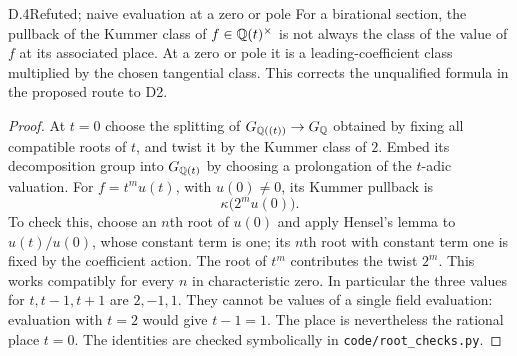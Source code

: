 \begin{claim}{D.4}{Refuted; naive evaluation at a zero or pole}
For a birational section, the pullback of the Kummer class of
$f\in\mathbb Q(t)^\times$ is not always the class of the value of $f$ at
its associated place. At a zero or pole it is a leading-coefficient
class multiplied by the chosen tangential class. This corrects the
unqualified formula in the proposed route to D2.
\end{claim}
\begin{proof}
At $t=0$ choose the splitting of
$G_{\mathbb Q((t))}\to G_\mathbb Q$ obtained by fixing all compatible roots of
$t$, and twist it by the Kummer class of $2$. Embed its decomposition
group into $G_{\mathbb Q(t)}$ by choosing a prolongation of the $t$-adic
valuation. For $f=t^m u(t)$, with $u(0)\ne0$, its Kummer pullback is
\[
                         \kappa\bigl(2^m u(0)\bigr).
\]
To check this, choose an $n$th root of $u(0)$ and apply Hensel's
lemma to $u(t)/u(0)$, whose constant term is one; its $n$th root
with constant term one is fixed by the coefficient action. The
root of $t^m$ contributes the twist $2^m$. This works compatibly
for every $n$ in characteristic zero. In particular the three
values for $t,t-1,t+1$ are $2,-1,1$. They cannot be values of a
single field evaluation: evaluation with $t=2$ would give $t-1=1$.
The place is nevertheless the rational place $t=0$. The identities
are checked symbolically in \texttt{code/root\_checks.py}.
\end{proof}


